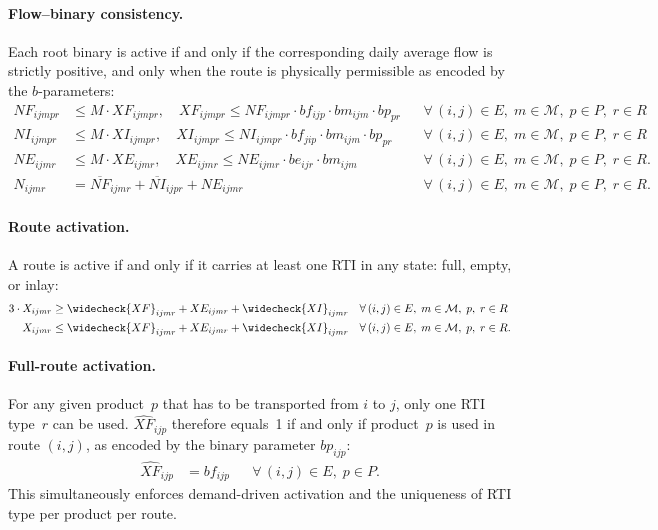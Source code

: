 \paragraph{Flow--binary consistency.}
Each root binary is active if and only if the corresponding
daily average flow is strictly positive, and only when the route
is physically permissible as encoded by the $b$-parameters:
%
\begin{align}
  NF_{ijmpr} &\leq M\cdot XF_{ijmpr},
  \quad
  XF_{ijmpr} \leq NF_{ijmpr}\cdot bf_{ijp}\cdot bm_{ijm} \cdot bp_{pr}
  && \forall\,(i,j)\in E,\;m\in\mathcal{M},\;p \in P,\;r\in R
  \label{eq:binary-full}\\
  NI_{ijmpr} &\leq M\cdot XI_{ijmpr},
  \quad
  XI_{ijmpr} \leq NI_{ijmpr}\cdot bf_{jip}\cdot bm_{ijm} \cdot bp_{pr}
  && \forall\,(i,j)\in E,\;m\in\mathcal{M},\;p \in P,\;r\in R
  \label{eq:binary-inlay}\\
  NE_{ijmr} &\leq M\cdot XE_{ijmr},
  \quad
  XE_{ijmr} \leq NE_{ijmr}\cdot be_{ijr} \cdot bm_{ijm}
  && \forall\,(i,j)\in E,\;m\in\mathcal{M},\;p \in P,\;r\in R.
  \label{eq:binary-empty} \\ 
  N_{ijmr} &= \overline{NF}_{ijmr}+\overline{NI}_{ijpr}+NE_{ijmr}
  && \forall\,(i,j)\in E,\;m\in\mathcal{M},\;p \in P,\;r\in R. 
\end{align}


\paragraph{Route activation.}
A route is active if and only if it carries at least one RTI in any state: full, empty, or inlay:
%
\begin{align}
  3\cdot X_{ijmr}
    &\geq \widecheck{XF}_{ijmr}+XE_{ijmr}+\widecheck{XI}_{ijmr}
  && \forall\,(i,j)\in E,\;m\in\mathcal{M},\;p,\;r\in R
  \label{eq:act-ub}\\
  X_{ijmr}
  &\leq  \widecheck{XF}_{ijmr}+XE_{ijmr}+\widecheck{XI}_{ijmr}
  && \forall\,(i,j)\in E,\;m\in\mathcal{M},\;p,\;r\in R.
  \label{eq:act-lb}
\end{align}


\paragraph{Full-route activation.}
For any given product~$p$ that has to be transported from $i $ to $j$, only one RTI type~$r$ can be used. $\widehat{XF}_{ijp}$
 therefore equals~1 if and only if
product~$p$ is used in route $(i,j)$, as encoded by the
binary parameter $bp_{ijp}$:
%
\begin{align}
  \widehat{XF}_{ijp} &= bf_{ijp}
  && \forall\,(i,j)\in E,\;p \in P.
  \label{eq:full-activation}
\end{align}
This simultaneously enforces demand-driven activation and the
uniqueness of RTI type per product per route.


